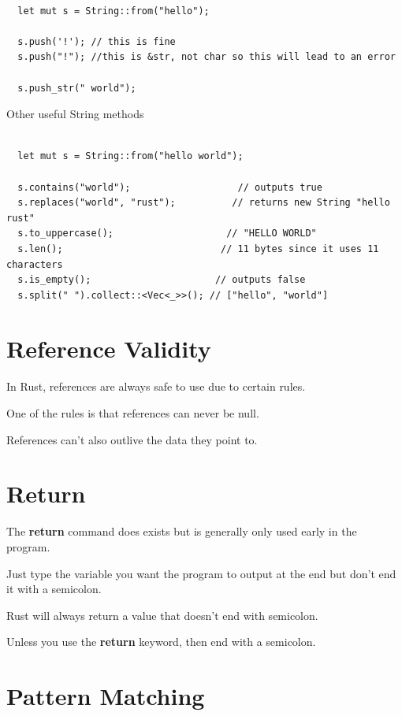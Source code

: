 \documentclass[11pt]{article}
\begin{document}
\begin{verbatim}

  let mut s = String::from("hello");

  s.push('!'); // this is fine
  s.push("!"); //this is &str, not char so this will lead to an error

  s.push_str(" world"); 

\end{verbatim}

Other useful String methods

\begin{verbatim}

  let mut s = String::from("hello world");

  s.contains("world");                   // outputs true
  s.replaces("world", "rust");          // returns new String "hello rust"
  s.to_uppercase();                    // "HELLO WORLD"
  s.len();                            // 11 bytes since it uses 11 characters
  s.is_empty();                      // outputs false
  s.split(" ").collect::<Vec<_>>(); // ["hello", "world"]    

\end{verbatim}
\section{Reference Validity}
\label{sec:org1ede5f0}

In Rust, references are always safe to use due to certain rules.

One of the rules is that references can never be null.

References can't also outlive the data they point to.
\section{Return}
\label{sec:org307c403}

The \textbf{return} command does exists but is generally only used early in the program.

Just type the variable you want the program to output at the end but don't end it with a semicolon.

Rust will always return a value that doesn't end with semicolon.

Unless you use the \textbf{return} keyword, then end with a semicolon.
\section{Pattern Matching}
\label{sec:org46af057}
\end{document}
